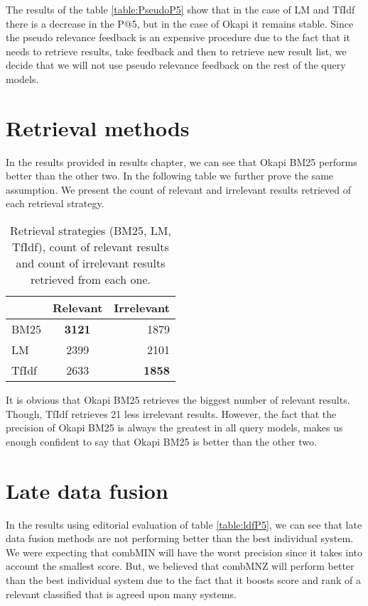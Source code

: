 The results of the table \ref{table:PseudoP5} show that in the case of LM and TfIdf there is a decrease in the P@5, but in the case of Okapi it remains stable. Since the pseudo relevance feedback is an expensive procedure due to the fact that it needs to retrieve results, take feedback and then to retrieve new result list, we decide that we will not use pseudo relevance feedback on the rest of the query models.



\section{Retrieval methods}

In the results provided in results chapter, we can see that Okapi BM25 performs better than the other two. In the following table we further prove the same assumption. We present the count of relevant and irrelevant results retrieved of each retrieval strategy.

\begin{table}[H]
\begin{center}
\caption{Retrieval strategies (BM25, LM, TfIdf), count of relevant results and count of irrelevant results retrieved from each one.}

\begin{tabular}{lcr}
\midrule
 & Relevant & Irrelevant  \\
\midrule
	BM25 & \textbf{3121} & 1879 \\
	LM & 2399 & 2101 \\
	TfIdf & 2633 & \textbf{1858} \\
\bottomrule
\end{tabular}
\end{center}
\end{table}

It is obvious that Okapi BM25 retrieves the biggest number of relevant results. Though, TfIdf retrieves 21 less irrelevant results. However, the fact that the precision of Okapi BM25 is always the greatest in all query models, makes us enough confident to say that Okapi BM25 is better than the other two.

\section{Late data fusion}

In the results using editorial evaluation of table \ref{table:ldfP5}, we can see that late data fusion methods are not performing better than the best individual system. We were expecting that combMIN will have the worst precision since it takes into account the smallest score. But, we believed that combMNZ will perform better than the best individual system due to the fact that it boosts score and rank of a relevant classified that is agreed upon many systems.

